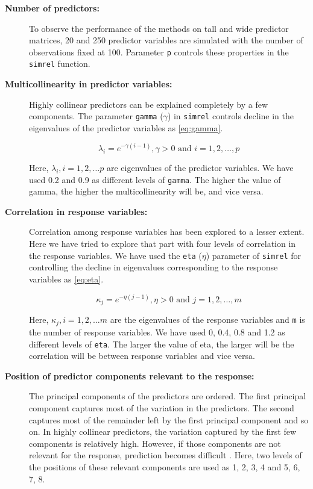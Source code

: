 \documentclass[review]{elsarticle}
\begin{document}
\begin{description}
\item[\textbf{Number of predictors:}]
To observe the performance of the methods on tall and wide predictor
matrices, 20 and 250 predictor variables are simulated with the number
of observations fixed at 100. Parameter \texttt{p} controls these
properties in the \texttt{simrel} function.
\item[\textbf{Multicollinearity in predictor variables:}]
Highly collinear predictors can be explained completely by a few
components. The parameter \texttt{gamma} (\(\gamma\)) in \texttt{simrel}
controls decline in the eigenvalues of the predictor variables as
\eqref{eq:gamma}.

\begin{equation}
  \lambda_i = e^{-\gamma(i - 1)}, \gamma > 0 \text{ and } i = 1, 2, \ldots, p
  \label{eq:gamma}
\end{equation}

Here, \(\lambda_i, i = 1, 2, \ldots p\) are eigenvalues of the predictor
variables. We have used 0.2 and 0.9 as different levels of
\texttt{gamma}. The higher the value of gamma, the higher the
multicollinearity will be, and vice versa.
\item[\textbf{Correlation in response variables:}]
Correlation among response variables has been explored to a lesser
extent. Here we have tried to explore that part with four levels of
correlation in the response variables. We have used the \texttt{eta}
(\(\eta\)) parameter of \texttt{simrel} for controlling the decline in
eigenvalues corresponding to the response variables as \eqref{eq:eta}.

\begin{equation}
  \kappa_j = e^{-\eta(j - 1)}, \eta > 0 \text{ and } j = 1, 2, \ldots, m
  \label{eq:eta}
\end{equation}

Here, \(\kappa_j, i = 1, 2, \ldots m\) are the eigenvalues of the
response variables and \texttt{m} is the number of response variables.
We have used 0, 0.4, 0.8 and 1.2 as different levels of \texttt{eta}.
The larger the value of eta, the larger will be the correlation will be
between response variables and vice versa.
\item[\textbf{Position of predictor components relevant to the
response:}]
The principal components of the predictors are ordered. The first
principal component captures most of the variation in the predictors.
The second captures most of the remainder left by the first principal
component and so on. In highly collinear predictors, the variation
captured by the first few components is relatively high. However, if
those components are not relevant for the response, prediction becomes
difficult \citep{Helland1994b}. Here, two levels of the positions of
these relevant components are used as 1, 2, 3, 4 and 5, 6, 7, 8.
\end{description}
\end{document}
